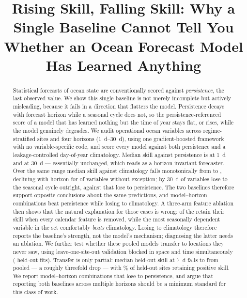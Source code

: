 \documentclass[conference]{IEEEtran}
\begin{document}
\title{Rising Skill, Falling Skill: Why a Single Baseline Cannot Tell You
Whether an Ocean Forecast Model Has Learned Anything}

\author{
}

\maketitle

\begin{abstract}
Statistical forecasts of ocean state are conventionally scored against
\emph{persistence}, the last observed value. We show this single baseline is
not merely incomplete but actively misleading, because it fails in a direction
that flatters the model. Persistence decays with forecast horizon while a
seasonal cycle does not, so the persistence-referenced score of a model that
has learned nothing but the time of year stays flat, or rises, while the model
genuinely degrades. We audit \NVars{} operational ocean variables across
\NSites{} regime-stratified sites and four horizons
(\SIrange{1}{30}{\day}), using one gradient-boosted framework with no
variable-specific code, and score every model against both persistence and a
leakage-controlled day-of-year climatology. Median skill against persistence is
\MedSkillPOne{} at \SI{1}{\day} and \MedSkillPThirty{} at \SI{30}{\day}
--- essentially unchanged, which reads as a horizon-invariant forecaster. Over
the same range median skill against climatology falls monotonically from
\MedSkillCOne{} to \MedSkillCThirty{}, declining with horizon for
\NFallingClim{} of \NVars{} variables without exception; by \SI{30}{\day}
\NLoseClimThirty{} of \NVars{} variables lose to the seasonal cycle outright,
against \NLosePersThirty{} that lose to persistence. The two baselines
therefore support opposite conclusions about the same predictions, and
\NLoseToClim{} model--horizon combinations beat persistence while losing to
climatology. A three-arm feature ablation then shows that the natural
explanation for those cases is wrong: \NFlatteredNonSeasonal{} of the
\NFlattered{} retain their skill when every calendar feature is removed, while
the most seasonally dependent variable in the set comfortably \emph{beats}
climatology. Losing to climatology therefore reports the baseline's strength,
not the model's mechanism; diagnosing the latter needs an ablation. We further
test whether these pooled models transfer to locations they never saw, using
leave-one-site-out validation blocked in space and time simultaneously
(\NLosoFits{} held-out fits). Transfer is only partial: median held-out skill
at \SI{7}{\day} falls to \MedLosoSeven{} from \MedPooledSeven{} pooled --- a
roughly threefold drop --- with \LosoPositiveShare{}\% of held-out sites
retaining positive skill. We report
\NLoseToPers{} model--horizon combinations that lose to persistence, and argue
that reporting both baselines across multiple horizons should be a minimum
standard for this class of work.
\end{abstract}
\end{document}
